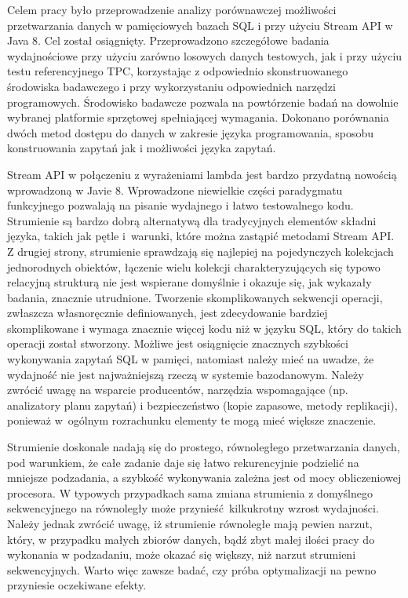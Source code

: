 \documentclass[12pt,twoside,openright]{extarticle}
\begin{document}
Celem pracy było przeprowadzenie analizy porównawczej możliwości przetwarzania danych w pamięciowych bazach SQL i przy użyciu Stream API w Java 8. Cel został osiągnięty. Przeprowadzono szczegółowe badania wydajnościowe przy użyciu zarówno losowych danych testowych, jak i przy użyciu testu referencyjnego TPC, korzystając z odpowiednio skonstruowanego środowiska badawczego i przy wykorzystaniu odpowiednich narzędzi programowych. Środowisko badawcze pozwala na powtórzenie badań na dowolnie wybranej platformie sprzętowej spełniającej wymagania. Dokonano porównania dwóch metod dostępu do danych w zakresie języka programowania, sposobu konstruowania zapytań jak i możliwości języka zapytań.

    Stream API w połączeniu z wyrażeniami lambda jest bardzo przydatną nowością wprowadzoną w Javie 8. Wprowadzone niewielkie części paradygmatu funkcyjnego pozwalają na pisanie wydajnego i łatwo testowalnego kodu. Strumienie są bardzo dobrą alternatywą dla tradycyjnych elementów składni języka, takich jak pętle i~warunki, które można zastąpić metodami Stream API. Z drugiej strony, strumienie sprawdzają się najlepiej na pojedynczych kolekcjach jednorodnych obiektów, łączenie wielu kolekcji charakteryzujących się typowo relacyjną strukturą nie jest wspierane domyślnie i okazuje się, jak wykazały badania, znacznie utrudnione. Tworzenie skomplikowanych sekwencji operacji, zwłaszcza własnoręcznie definiowanych, jest zdecydowanie bardziej skomplikowane i wymaga znacznie więcej kodu niż w języku SQL, który do takich operacji został stworzony. Możliwe jest osiągnięcie znacznych szybkości wykonywania zapytań SQL w pamięci, natomiast należy mieć na uwadze, że wydajność nie jest najważniejszą rzeczą w systemie bazodanowym. Należy zwrócić uwagę na wsparcie producentów, narzędzia wspomagające (np. analizatory planu zapytań) i bezpieczeństwo (kopie zapasowe, metody replikacji), ponieważ w~ogólnym rozrachunku elementy te mogą mieć większe znaczenie.

    Strumienie doskonale nadają się do prostego, równoległego przetwarzania danych, pod warunkiem, że całe zadanie daje się łatwo rekurencyjnie podzielić na mniejsze podzadania, a szybkość wykonywania zależna jest od mocy obliczeniowej procesora. W typowych przypadkach sama zmiana strumienia z domyślnego sekwencyjnego na równoległy może przynieść kilkukrotny wzrost wydajności. Należy jednak zwrócić uwagę, iż strumienie równoległe mają pewien narzut, który, w przypadku małych zbiorów danych, bądź zbyt małej ilości pracy do wykonania w podzadaniu, może okazać się większy, niż narzut strumieni sekwencyjnych. Warto więc zawsze badać, czy próba optymalizacji na pewno przyniesie oczekiwane efekty.
\end{document}
